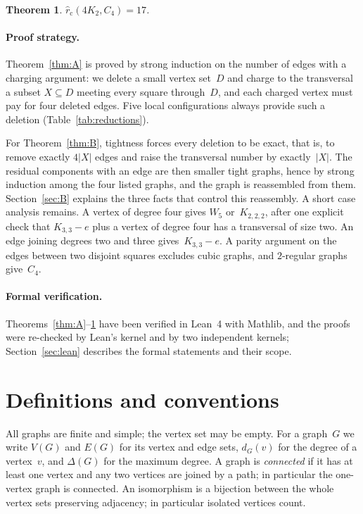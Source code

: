 \documentclass[11pt,letterpaper]{article}
\numberwithin{equation}{section}
\theoremstyle{plain}
\newtheorem{mainthm}{Theorem}
\theoremstyle{definition}
\theoremstyle{remark}
\newcommand{\Kme}{K_{3,3}-e}
\newcommand{\Oct}{K_{2,2,2}}
\newcommand{\rc}{\hat r_{\mathrm{c}}}
\begin{document}
\begin{mainthm}\label{thm:E}
$\rc(4K_2,C_4)=17$.
\end{mainthm}

\paragraph{Proof strategy.} Theorem~\ref{thm:A} is proved by strong induction on the number of edges with a charging argument: we delete a small vertex set~$D$ and charge to the transversal a subset $X\subseteq D$ meeting every square through~$D$, and each charged vertex must pay for four deleted edges. Five local configurations always provide such a deletion (Table~\ref{tab:reductions}).

For Theorem~\ref{thm:B}, tightness forces every deletion to be exact, that is, to remove exactly $4|X|$ edges and raise the transversal number by exactly~$|X|$. The residual components with an edge are then smaller tight graphs, hence by strong induction among the four listed graphs, and the graph is reassembled from them. Section~\ref{sec:B} explains the three facts that control this reassembly. A short case analysis remains. A vertex of degree four gives $W_5$ or~$\Oct$, after one explicit check that $\Kme$ plus a vertex of degree four has a transversal of size two. An edge joining degrees two and three gives~$\Kme$. A parity argument on the edges between two disjoint squares excludes cubic graphs, and $2$-regular graphs give~$C_4$.

\paragraph{Formal verification.} Theorems~\ref{thm:A}--\ref{thm:E} have been verified in Lean~4 with Mathlib, and the proofs were re-checked by Lean's kernel and by two independent kernels; Section~\ref{sec:lean} describes the formal statements and their scope.

\section{Definitions and conventions}\label{sec:defs}

All graphs are finite and simple; the vertex set may be empty. For a graph~$G$ we write $V(G)$ and $E(G)$ for its vertex and edge sets, $d_G(v)$ for the degree of a vertex~$v$, and $\Delta(G)$ for the maximum degree. A graph is \emph{connected} if it has at least one vertex and any two vertices are joined by a path; in particular the one-vertex graph is connected. An isomorphism is a bijection between the whole vertex sets preserving adjacency; in particular isolated vertices count.
\end{document}
